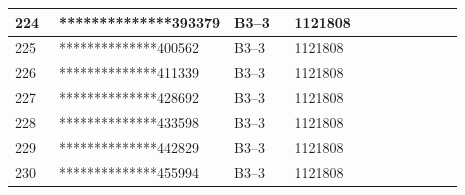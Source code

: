 \documentclass[UTF8,10pt,a4paper,fontset=fandol]{ctexart}
\newcommand{\fieldvalue}[1]{#1}
\begin{document}
\begin{center}
\begin{tabular}{|p{0.10\linewidth}|p{0.25\linewidth}|p{0.14\linewidth}|p{0.24\linewidth}|p{0.16\linewidth}|}
\fieldvalue{224} &
\fieldvalue{**************393379} &
\fieldvalue{B3--3} &
\fieldvalue{1121808} & \\ \hline

\fieldvalue{225} &
\fieldvalue{**************400562} &
\fieldvalue{B3--3} &
\fieldvalue{1121808} & \\ \hline

\fieldvalue{226} &
\fieldvalue{**************411339} &
\fieldvalue{B3--3} &
\fieldvalue{1121808} & \\ \hline

\fieldvalue{227} &
\fieldvalue{**************428692} &
\fieldvalue{B3--3} &
\fieldvalue{1121808} & \\ \hline

\fieldvalue{228} &
\fieldvalue{**************433598} &
\fieldvalue{B3--3} &
\fieldvalue{1121808} & \\ \hline

\fieldvalue{229} &
\fieldvalue{**************442829} &
\fieldvalue{B3--3} &
\fieldvalue{1121808} & \\ \hline

\fieldvalue{230} &
\fieldvalue{**************455994} &
\fieldvalue{B3--3} &
\fieldvalue{1121808} & \\ \hline


\end{tabular}
\end{center}
\end{document}
